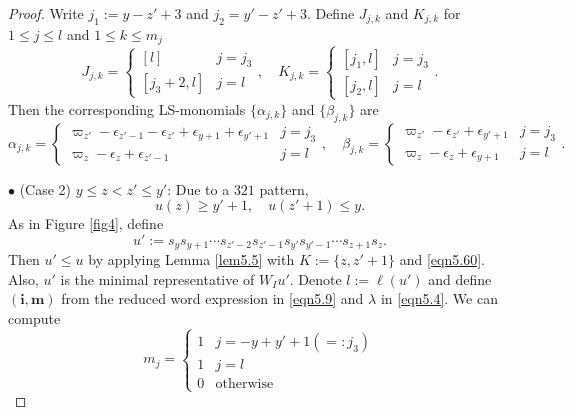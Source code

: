 \documentclass[12pt]{amsart}
\theoremstyle{definition}
\theoremstyle{remark}
\begin{document}
\begin{proof}
Write $j_1:=y-z'+3$ and $j_2 = y'-z'+3$. Define $J_{j,k}$ and $K_{j,k}$ for $1\leq j \leq l$ and $1 \leq k \leq m_j$
\begin{equation}\label{eqn5.7}
J_{j,k} = 
\begin{cases}
[l] & j=j_3 \\
[j_3+2,l] & j = l
\end{cases}
, \quad K_{j,k}=
\begin{cases}
[j_1,l] & j =j_3 \\
[j_2,l] & j =l
\end{cases}
.
\end{equation}
Then the corresponding LS-monomials $\{\alpha_{j,k}\}$ and $\{\beta_{j,k}\}$ are
\begin{equation}\label{eqn5.8}
\alpha_{j,k} = 
\begin{cases}
\varpi_{z'} - \epsilon_{z'-1}-\epsilon_{z'} + \epsilon_{y+1} + \epsilon_{y'+1} & j = j_3 \\
\varpi_z-\epsilon_{z} + \epsilon_{z'-1} & j=l 
\end{cases}
, \quad \beta_{j,k}=
\begin{cases}
\varpi_{z'}-\epsilon_{z'}+\epsilon_{y'+1} & j=j_3 \\
\varpi_{z}-\epsilon_z + \epsilon_{y+1} & j=l
\end{cases}
.
\end{equation}

$\bullet$ (Case 2) $y \leq z <z' \leq y'$: Due to a $321$ pattern,
\begin{equation}\label{eqn5.60}
u(z) \geq y'+1, \quad u(z' +1 ) \leq y.
\end{equation}
As in Figure \ref{fig4}, define
\begin{equation}\label{eqn5.9}
u':=s_y s_{y+1} \cdots s_{z'-2}s_{z'-1} s_{y'}s_{y'-1} \cdots s_{z+1}s_z.
\end{equation}
Then $u' \leq u$ by applying Lemma \ref{lem5.5} with $K:=\{z, z' +1 \}$ and \eqref{eqn5.60}. Also, $u'$ is the minimal representative of $W_Iu'$. Denote $l:= \ell (u')$ and define $(\mathbf{i}, \mathbf{m})$ from the reduced word expression in \eqref{eqn5.9} and $\lambda$ in \eqref{eqn5.4}. We can compute
\begin{equation}\label{eqn5.10}
m_j = 
\begin{cases}
1 & j = -y+y'+1 (=:j_3) \\
1 & j = l \\
0 & \text{otherwise}
\end{cases}
\end{equation}


\end{proof}
\end{document}

